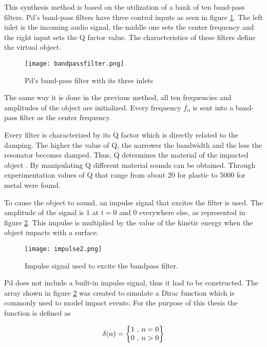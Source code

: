 This synthesis method is based on the utilization of a bank of ten band-pass filters. \gls{Pd}'s band-pass filters have three control inputs as seen in figure \ref{fig:pdbandpass}. The left inlet is the incoming audio signal, the middle one sets the center frequency and the right input sets the \gls{Q} factor value. The characteristics of these filters define the virtual object.

\begin{figure}[H]
  \centering
    \texttt{[image: bandpassfilter.png]}
      \caption{Pd's band-pass filter with its three inlets}
      \label{fig:pdbandpass}
\end{figure} 

The same way it is done in the previous method, all ten frequencies and amplitudes of the object are initialized. Every frequency $f_n$ is sent into a band-pass filter as the center frequency. 

Every filter is characterized by its \gls{Q} factor which is directly related to the damping. The higher the value of \gls{Q}, the narrower the bandwidth and the less the resonator becomes damped. Thus, \gls{Q} determines the material of the impacted object \cite{gaver1993we}. By manipulating \gls{Q} different material sounds can be obtained. Through experimentation values of \gls{Q} that range from about 20 for plastic to 5000 for metal were found. 

To cause the object to sound, an impulse signal that excites the filter is used. The amplitude of the signal is 1 at $t=0$ and 0 everywhere else, as represented in figure \ref{fig:impulse}. This impulse is multiplied by the value of the kinetic energy when the object impacts with a surface. 

\begin{figure}[H]
  \centering
    \texttt{[image: impulse2.png]}
      \caption{Impulse signal used to excite the bandpass filter.}
      \label{fig:impulse}
\end{figure} 

\gls{Pd} does not include a built-in impulse signal, thus it had to be constructed. The array shown in figure \ref{fig:impulse} was created to simulate a Dirac function which is commonly used to model impact events. For the purpose of this thesis the function is defined as

\begin{equation}\label{eq:dirac}
\delta (n) =  \begin{Bmatrix}
1$ , $n = 0
\\ 
0$ , $n > 0
\end{Bmatrix}
\end{equation}


